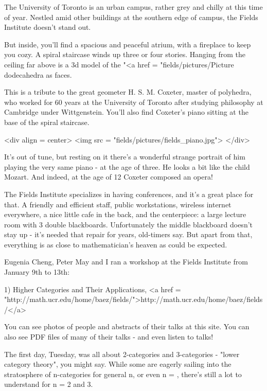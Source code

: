 

The University of Toronto is an urban campus, rather grey and chilly 
at this time of year.  Nestled amid other buildings at the southern
edge of campus, the Fields Institute doesn't stand out.  

But inside, you'll find a spacious and peaceful atrium, with a
fireplace to keep you cozy.  A spiral staircase winds up three or four
stories.  Hanging from the ceiling far above is a 3d model of the
"<a href = "fields/pictures/Picture%
dodecahedra as faces.

This is a tribute to the great geometer H. S. M. Coxeter, master of
polyhedra, who worked for 60 years at the University of Toronto after 
studying philosophy at Cambridge under Wittgenstein.  You'll also
find Coxeter's piano sitting at the base of the spiral staircase.  

<div align = center>
<img src = "fields/pictures/fields_piano.jpg">
</div>

It's out of tune, but resting on it there's a wonderful strange 
portrait of him playing the very same piano - at the age of three.
He looks a bit like the child Mozart.  And indeed, at the age of 12 
Coxeter composed an opera!

The Fields Institute specializes in having conferences, and it's
a great place for that.  A friendly and efficient staff, public 
workstations, wireless internet everywhere, a nice little cafe in 
the back, and the centerpiece: a large lecture room with 3 double 
blackboards.  Unfortunately the middle blackboard doesn't stay up - 
it's needed that repair for years, old-timers say.  But apart from 
that, everything is as close to mathematician's heaven as could be 
expected.

Eugenia Cheng, Peter May and I ran a workshop at the Fields
Institute from January 9th to 13th:

1) Higher Categories and Their Applications, 
<a href = "http://math.ucr.edu/home/baez/fields/">http://math.ucr.edu/home/baez/fields/</a>

You can see photos of people and abstracts of their talks
at this site.  You can also see PDF files of many of their 
talks - and even listen to talks!

The first day, Tuesday, was all about 2-categories and 3-categories - 
"lower category theory", you might say.   While some are 
eagerly sailing into the stratosphere of n-categories for 
general n, or even n = \infty , there's still a lot to 
understand for n = 2 and 3.   

